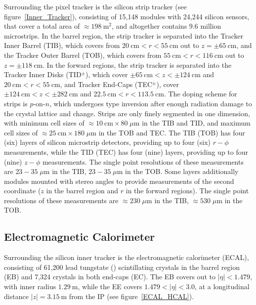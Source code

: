 Surrounding the pixel tracker is the silicon strip tracker (see figure~\ref{Inner_Tracker}), consisting of 15,148 modules with 24,244 silicon sensors, that cover a total area of $\approx \SI{198}{\m \squared}$, and altogether contains 9.6 million microstrips.
In the barrel region, the strip tracker is separated into the Tracker Inner Barrel (TIB), which covers from $\SI{20}{\cm} < r < \SI{55}{\cm}$ out to $z = \pm \SI{65}{\cm}$, and the Tracker Outer Barrel (TOB), which covers from $\SI{55}{\cm} < r < \SI{116}{\cm}$ out to $z = \pm \SI{118}{\cm}$.
In the forward regions, the strip tracker is separated into the Tracker Inner Disks (TID$^\pm$), which cover $\pm\SI{65}{\cm} < z < \pm\SI{124}{\cm}$ and $\SI{20}{\cm} < r < \SI{55}{\cm}$, and Tracker End-Caps (TEC$^\pm$), cover $\pm\SI{124}{\cm} < z < \pm\SI{282}{\cm}$ and $\SI{22.5}{\cm} < r < \SI{113.5}{\cm}$.
The doping scheme for strips is $p$-on-$n$, which undergoes type inversion after enough radiation damage to the crystal lattice and change.
Strips are only finely segmented in one dimension, with minimum cell sizes of  $\approx \SI{10}{\cm} \times 80 \; \mu \si{\m}$ in the TIB and TID, and maximum cell sizes of $\approx \SI{25}{\cm} \times 180 \; \mu \si{\m}$ in the TOB and TEC.
The TIB (TOB) has four (six) layers of silicon microstrip detectors, providing up to four (six) $r-\phi$ measurements, while the TID (TEC) has four (nine) layers, providing up to four (nine) $z-\phi$ measurements.
The single point resolutions of these measurements are $23-35 \; \mu \si{\m}$ in the TIB, $23-35 \; \mu \si{\m}$ in the TOB.
Some layers additionally modules mounted with stereo angles to provide measurements of the second coordinate ($z$ in the barrel region and $r$ in the forward regions).
The single point resolutions of these measurements are $\approx 230 \; \mu \si{\m}$ in the TIB, $\approx 530 \; \mu \si{\m}$ in the TOB.

\subsection{Electromagnetic Calorimeter}
Surrounding the silicon inner tracker is the electromagnetic calorimeter (ECAL), consisting of 61,200 lead tungstate () scintillating crystals in the barrel region (EB) and 7,324 crystals in both end-caps (EC).
The EB covers out to $\vert \eta \vert < 1.479$, with inner radius $\SI{1.29}{\m}$, while the EE covers $1.479 < \vert \eta \vert < 3.0$, at a longitudinal distance $\vert z \vert = \SI{3.15}{\m}$ from the IP (see figure~\ref{ECAL_HCAL}).

